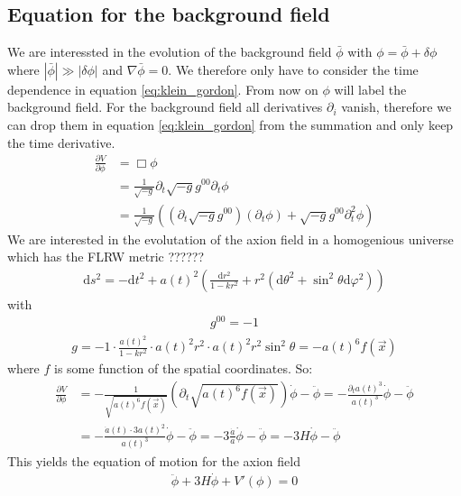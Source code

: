 \documentclass[a4paper]{article}
\begin{document}
\subsection{Equation for the background field}
We are interessted in the evolution of the background field $\bar{\phi}$ with $\phi = \bar{\phi} + \delta \phi$ where
$|\bar{\phi}| \gg |\delta \phi|$ and $\nabla \bar{\phi} = 0$. We therefore only have to consider the time dependence in equation \ref{eq:klein_gordon}. From now on $\phi$ will label the background field.
For the background field all derivatives $\partial_i$ vanish, therefore we can drop them in equation \ref{eq:klein_gordon} from the summation and only keep the time derivative.
\begin{align*}
    \frac{\partial V}{\partial \phi} &= \Box \phi \\
                                     &= \frac{1}{\sqrt{-g}} \partial_t \sqrt{-g} g^{00} \partial_t \phi \\
                                     &= \frac{1}{\sqrt{-g}} \left( (\partial_t \sqrt{-g} g^{00}) (\partial_t \phi) + \sqrt{-g} g^{00} \partial^2_t \phi \right)
\end{align*}
We are interested in the evolutation of the axion field in a homogenious universe which has the FLRW metric ??????
\begin{align}
    \label{eq:flrw}
    \mathrm{d}s^2 = -\mathrm{d}t^2 + a(t)^2 \left(\frac{\mathrm{d}r^2}{1 - kr^2} + r^2(\mathrm{d}\theta^2 + \sin^2 \theta \mathrm{d} \varphi^2)\right)
\end{align}
with
\begin{align*}
    g^{00} = -1
\end{align*}
\begin{align*}
    g = -1 \cdot \frac{a(t)^2}{1 - kr^2} \cdot a(t)^2 r^2 \cdot a(t)^2 r^2 \sin^2 \theta
      = - a(t)^6 f(\vec{x})
\end{align*}
where $f$ is some function of the spatial coordinates.
So:
\begin{align*}
    \frac{\partial V}{\partial \phi} &= - \frac{1}{\sqrt{a(t)^6 f(\vec{x})}} (\partial_t \sqrt{ a(t)^6 f(\vec{x}) }) \dot{\phi} - \ddot{\phi}
                                     = - \frac{\partial_t a(t)^3}{a(t)^3} \dot{\phi} - \ddot{\phi} \\
                                     &= - \frac{\dot{a}(t) \cdot 3 a(t)^2}{a(t)^3} \dot{\phi} - \ddot{\phi}
                                     = - 3 \frac{\dot{a}}{a} \dot{\phi} - \ddot{\phi}
                                     = - 3H \dot{\phi} - \ddot{\phi}
\end{align*}
This yields the equation of motion for the axion field
\begin{align}
    \label{eq:eom}
    \ddot{\phi} + 3 H \dot{\phi} + V'(\phi) = 0
\end{align}
\end{document}
